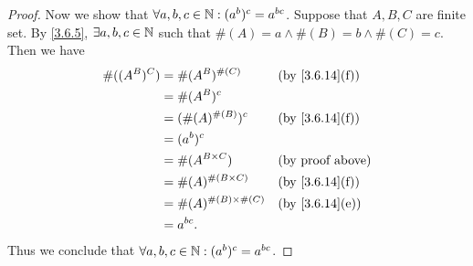 \begin{proof}
  Now we show that \(\forall a, b, c \in \mathbb{N} : (a^b)^c = a^{bc}\).
  Suppose that \(A, B, C\) are finite set.
  By \cref{3.6.5}, \(\exists a, b, c \in \mathbb{N}\) such that \(\#(A) = a \land \#(B) = b \land \#(C) = c\).
  Then we have
  \begin{align*}
    \#((A^B)^C) & = \#(A^B)^{\#(C)}            &  & \text{(by \cref{3.6.14}(f))} \\
                & = \#(A^B)^c                                                    \\
                & = (\#(A)^{\#(B)})^c          &  & \text{(by \cref{3.6.14}(f))} \\
                & = (a^b)^c                                                      \\
                & = \#(A^{B \times C})         &  & \text{(by proof above)}      \\
                & = \#(A)^{\#(B \times C)}     &  & \text{(by \cref{3.6.14}(f))} \\
                & = \#(A)^{\#(B) \times \#(C)} &  & \text{(by \cref{3.6.14}(e))} \\
                & = a^{bc}.
  \end{align*}
  Thus we conclude that \(\forall a, b, c \in \mathbb{N} : (a^b)^c = a^{bc}\).


\end{proof}

